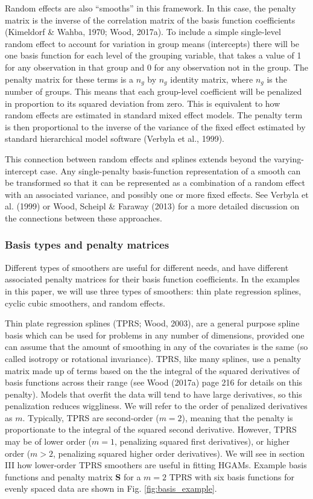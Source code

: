 \documentclass[12pt]{article}
\begin{document}
Random effects are also ``smooths'' in this framework. In this case, the
penalty matrix is the inverse of the correlation matrix of the basis
function coefficients (Kimeldorf \& Wahba, 1970; Wood, 2017a). To
include a simple single-level random effect to account for variation in
group means (intercepts) there will be one basis function for each level
of the grouping variable, that takes a value of 1 for any observation in
that group and 0 for any observation not in the group. The penalty
matrix for these terms is a \(n_g\) by \(n_g\) identity matrix, where
\(n_g\) is the number of groups. This means that each group-level
coefficient will be penalized in proportion to its squared deviation
from zero. This is equivalent to how random effects are estimated in
standard mixed effect models. The penalty term is then proportional to
the inverse of the variance of the fixed effect estimated by standard
hierarchical model software (Verbyla et al., 1999).

This connection between random effects and splines extends beyond the
varying-intercept case. Any single-penalty basis-function representation
of a smooth can be transformed so that it can be represented as a
combination of a random effect with an associated variance, and possibly
one or more fixed effects. See Verbyla et al. (1999) or Wood, Scheipl \&
Faraway (2013) for a more detailed discussion on the connections between
these approaches.

\subsubsection{Basis types and penalty
matrices}\label{basis-types-and-penalty-matrices}

Different types of smoothers are useful for different needs, and have
different associated penalty matrices for their basis function
coefficients. In the examples in this paper, we will use three types of
smoothers: thin plate regression splines, cyclic cubic smoothers, and
random effects.

Thin plate regression splines (TPRS; Wood, 2003), are a general purpose
spline basis which can be used for problems in any number of dimensions,
provided one can assume that the amount of smoothing in any of the
covariates is the same (so called isotropy or rotational invariance).
TPRS, like many splines, use a penalty matrix made up of terms based on
the the integral of the squared derivatives of basis functions across
their range (see Wood (2017a) page 216 for details on this penalty).
Models that overfit the data will tend to have large derivatives, so
this penalization reduces wiggliness. We will refer to the order of
penalized derivatives as \(m\). Typically, TPRS are second-order
(\(m=2\)), meaning that the penalty is proportionate to the integral of
the squared second derivative. However, TPRS may be of lower order
(\(m=1\), penalizing squared first derivatives), or higher order
(\(m > 2\), penalizing squared higher order derivatives). We will see in
section III how lower-order TPRS smoothers are useful in fitting HGAMs.
Example basis functions and penalty matrix \(\mathbf{S}\) for a \(m=2\)
TPRS with six basis functions for evenly spaced data are shown in Fig.
\ref{fig:basis_example}.
\end{document}
